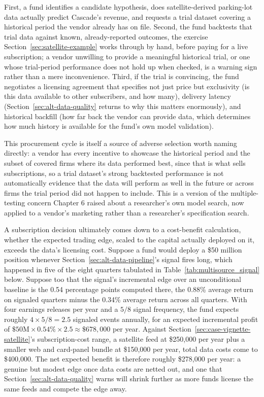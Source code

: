 \documentclass[../ai_in_finance]{subfiles}
\begin{document}
First, a fund identifies a candidate hypothesis, does satellite-derived parking-lot data actually predict Cascade's revenue, and requests a trial dataset covering a historical period the vendor already has on file. Second, the fund backtests that trial data against known, already-reported outcomes, the exercise Section~\ref{sec:satellite-example} works through by hand, before paying for a live subscription; a vendor unwilling to provide a meaningful historical trial, or one whose trial-period performance does not hold up when checked, is a warning sign rather than a mere inconvenience. Third, if the trial is convincing, the fund negotiates a licensing agreement that specifies not just price but exclusivity (is this data available to other subscribers, and how many), delivery latency (Section~\ref{sec:alt-data-quality} returns to why this matters enormously), and historical backfill (how far back the vendor can provide data, which determines how much history is available for the fund's own model validation).

This procurement cycle is itself a source of adverse selection worth naming directly: a vendor has every incentive to showcase the historical period and the subset of covered firms where its data performed best, since that is what sells subscriptions, so a trial dataset's strong backtested performance is not automatically evidence that the data will perform as well in the future or across firms the trial period did not happen to include. This is a version of the multiple-testing concern Chapter 6 raised about a researcher's own model search, now applied to a vendor's marketing rather than a researcher's specification search.

A subscription decision ultimately comes down to a cost-benefit calculation, whether the expected trading edge, scaled to the capital actually deployed on it, exceeds the data's licensing cost. Suppose a fund would deploy a \$50 million position whenever Section~\ref{sec:alt-data-pipeline}'s signal fires long, which happened in five of the eight quarters tabulated in Table~\ref{tab:multisource_signal} below. Suppose too that the signal's incremental edge over an unconditional baseline is the 0.54 percentage points computed there, the 0.88\% average return on signaled quarters minus the 0.34\% average return across all quarters. With four earnings releases per year and a $5/8$ signal frequency, the fund expects roughly $4 \times 5/8 = 2.5$ signaled events annually, for an expected incremental profit of $\$50\text{M} \times 0.54\% \times 2.5 \approx \$678{,}000$ per year. Against Section~\ref{sec:case-vignette-satellite}'s subscription-cost range, a satellite feed at \$250,000 per year plus a smaller web and card-panel bundle at \$150,000 per year, total data costs come to \$400,000. The net expected benefit is therefore roughly \$278,000 per year: a genuine but modest edge once data costs are netted out, and one that Section~\ref{sec:alt-data-quality} warns will shrink further as more funds license the same feeds and compete the edge away.
\end{document}
